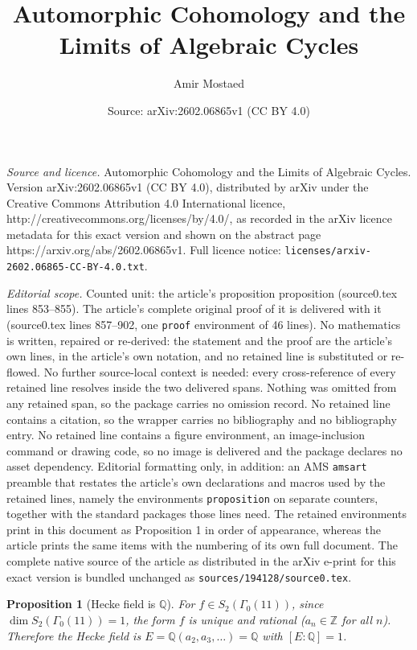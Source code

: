 \documentclass[10pt,a4paper]{amsart}
\title{Automorphic Cohomology and the Limits of Algebraic Cycles}
\author{Amir Mostaed}
\date{Source: arXiv:2602.06865v1 (CC BY 4.0)}
\newtheorem{proposition}{Proposition}
\newcommand{\Q}{\mathbb{Q}}
\newcommand{\Z}{\mathbb{Z}}
\begin{document}
\maketitle

\noindent\emph{Source and licence.} Automorphic Cohomology and the Limits of Algebraic Cycles. Version arXiv:2602.06865v1 (CC BY 4.0), distributed by arXiv under the Creative Commons Attribution 4.0 International licence, http://creativecommons.org/licenses/by/4.0/, as recorded in the arXiv licence metadata for this exact version and shown on the abstract page https://arxiv.org/abs/2602.06865v1. Full licence notice: \texttt{licenses/arxiv-2602.06865-CC-BY-4.0.txt}.\par\smallskip

\noindent\textit{Editorial scope.} Counted unit: the article's proposition proposition (source0.tex lines 853--855). The article's complete original proof of it is delivered with it (source0.tex lines 857--902, one \texttt{proof} environment of 46 lines). No mathematics is written, repaired or re-derived: the statement and the proof are the article's own lines, in the article's own notation, and no retained line is substituted or re-flowed.  No further source-local context is needed: every cross-reference of every retained line resolves inside the two delivered spans.  Nothing was omitted from any retained span, so the package carries no omission record.  No retained line contains a citation, so the wrapper carries no bibliography and no bibliography entry.  No retained line contains a figure environment, an image-inclusion command or drawing code, so no image is delivered and the package declares no asset dependency.  Editorial formatting only, in addition: an AMS \texttt{amsart} preamble that restates the article's own declarations and macros used by the retained lines, namely the environments \texttt{proposition} on separate counters, together with the standard packages those lines need.  The retained environments print in this document as Proposition 1 in order of appearance, whereas the article prints the same items with the numbering of its own full document.  The complete native source of the article as distributed in the arXiv e-print for this exact version is bundled unchanged as \texttt{sources/194128/source0.tex}.
\begin{proposition}[Hecke field is $\Q$]
For $f \in S_2(\Gamma_0(11))$, since $\dim S_2(\Gamma_0(11)) = 1$, the form $f$ is unique and rational ($a_n \in \Z$ for all $n$). Therefore the Hecke field is $E = \Q(a_2, a_3, \ldots) = \Q$ with $[E : \Q] = 1$.
\end{proposition}
\end{document}
